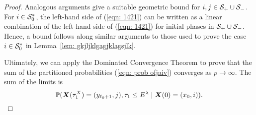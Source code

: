 \begin{proof}
	Analogous arguments give a suitable geometric bound for \(i,j\in\mathcal{S}_+\cup\mathcal{S}_-\). For \(i\in\mathcal{S}_0^*\), the left-hand side of (\ref{eqn: 1421}) can be written as a linear combination of the left-hand side of (\ref{eqn: 1421}) for initial phases in \(\mathcal{S}_+\cup\mathcal{S}_-\). Hence, a bound follows along similar arguments to those used to prove the case \(i\in\mathcal{S}_0^*\) in Lemma~\ref{lem: gkjljklgagjklagsjlk}.
	
	Ultimately, we can apply the Dominated Convergence Theorem to prove that the sum of the partitioned probabilities (\ref{eqn: prob ofjaiv}) converges as \(p\to\infty\). The sum of the limits is 
	\[\mathbb P(\boldsymbol X(\tau_1^X) = (y_{\ell_0+1}, j), \tau_{1}\leq E^\lambda 
            	 \mid \boldsymbol X(0) = (x_0,i)).\]
	 
\end{proof}